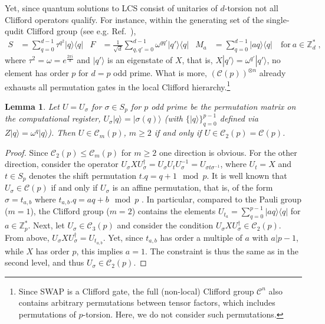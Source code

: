 \documentclass[aps,pra,letterpaper,onrcolumn,nofootinbib,notitlepage,longbibliography]{revtex4-1}
\newtheorem{lemma}{Lemma}
\newcommand{\zz}{\mathbb Z}
\newcommand\mc[1]{\mathcal{#1}}
\newcommand{\cC}{\mc{C}}
\begin{document}
Yet, since quantum solutions to LCS consist of unitaries of $d$-torsion not all Clifford operators qualify. For instance, within the generating set of the single-qudit Clifford group (see e.g. Ref.~\cite{deBeaudrap2013}),
\begin{align}\label{eq: Clifford generators}
    S&=\sum_{q=0}^{d-1}\tau^{q^2}|q\rangle\langle q| &
    F&=\frac{1}{\sqrt{d}}\sum_{q,q'=0}^{d-1}\omega^{qq'}|q'\rangle\langle q| &
    M_a&=\sum_{q=0}^{d-1}|aq\rangle\langle q|\quad\mathrm{for}\ a\in\zz^*_d\; ,
\end{align}
where $\tau^2=\omega=e^{\frac{2\pi i}{d}}$ and $|q'\rangle$ is an eigenstate of $X$, that is, $X|q'\rangle=\omega^{q'}|q'\rangle$, no element has order $p$ for $d=p$ odd prime. What is more, $(\cC(p))^{\otimes n}$ already exhausts all permutation gates in the local Clifford hierarchy.\footnote{Since SWAP is a Clifford gate, the full (non-local) Clifford group $\cC^n$ also contains arbitrary permutations between tensor factors, which includes permutations of $p$-torsion. Here, we do not consider such permutations.}

\begin{lemma}\label{lm: Clifford permutations}
    Let $U=U_\sigma$ for $\sigma\in S_p$ for $p$ odd prime be the permutation matrix on the computational register, $U_\sigma|q\rangle=|\sigma(q)\rangle$ (with $\{|q\rangle\}_{q=0}^{p-1}$ defined via $Z|q\rangle=\omega^q|q\rangle$). Then $U\in\cC_m(p)$, $m\geq 2$ if and only if $U\in\cC_2(p)=\cC(p)$.
\end{lemma}

\begin{proof}
    Since $\cC_2(p)\leq\cC_m(p)$ for $m\geq 2$ one direction is obvious. For the other direction, consider the operator $U_\sigma XU^\dagger_\sigma=U_\sigma U_tU^{-1}_\sigma=U_{\sigma t\sigma^{-1}}$, where $U_t=X$ and $t\in S_p$ denotes the shift permutation $t.q=q+1\mod p$. It is well known that $U_\sigma\in\cC(p)$ if and only if $U_\sigma$ is an affine permutation, that is, of the form $\sigma=t_{a,b}$ where $t_{a,b}.q=aq+b\mod p$ \cite{deBeaudrap2013}. In particular, compared to the Pauli group ($m=1$), the Clifford group ($m=2$) contains the elements $U_{t_a}=\sum_{q=0}^{p-1}|aq\rangle\langle q|$ for $a\in\zz^*_p$. Next, let $U_\sigma\in\cC_3(p)$ and consider the condition $U_\sigma XU^\dagger_\sigma\in\cC_2(p)$. From above, $U_\sigma XU^\dagger_\sigma=U_{t_{a,b}}$. Yet, since $t_{a,b}$ has order a multiple of $a$ with $a|p-1$, while $X$ has order $p$, this implies $a=1$. The constraint is thus the same as in the second level, and thus $U_\sigma\in\cC_2(p)$.
\end{proof}
\end{document}
